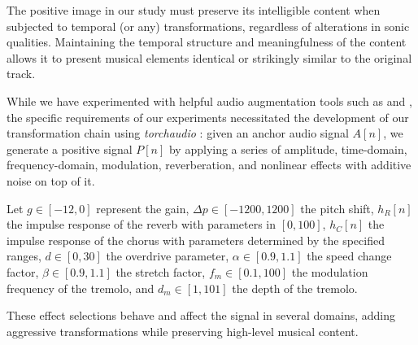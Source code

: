 The positive image in our study must preserve its intelligible content when subjected to temporal (or any) transformations, regardless of alterations in sonic qualities. Maintaining the temporal structure and meaningfulness of the content allows it to present musical elements identical or strikingly similar to the original track.

While we have experimented with helpful audio augmentation tools such as \cite{Spijkervet2021Spijkervet/torchaudio-augmentations:V1.0} and \cite{Kharitonov2020DataDomain}, the specific requirements of our experiments necessitated the development of our transformation chain using \textit{torchaudio} \cite{Yang2021TorchAudio:Processing}: given an anchor audio signal $A[n]$, we generate a positive signal $P[n]$ by applying a series of amplitude, time-domain, frequency-domain, modulation, reverberation, and nonlinear effects with additive noise on top of it. 

Let $g \in [-12, 0]$ represent the gain, $\Delta p \in [-1200, 1200]$ the pitch shift, $h_R[n]$ the impulse response of the reverb with parameters in $[0, 100]$, $h_C[n]$ the impulse response of the chorus with parameters determined by the specified ranges, $d \in [0, 30]$ the overdrive parameter, $\alpha \in [0.9, 1.1]$ the speed change factor, $\beta \in [0.9, 1.1]$ the stretch factor, $f_m \in [0.1, 100]$ the modulation frequency of the tremolo, and $d_m \in [1, 101]$ the depth of the tremolo. 

These effect selections behave and affect the signal in several domains, adding aggressive transformations while preserving high-level musical content.


